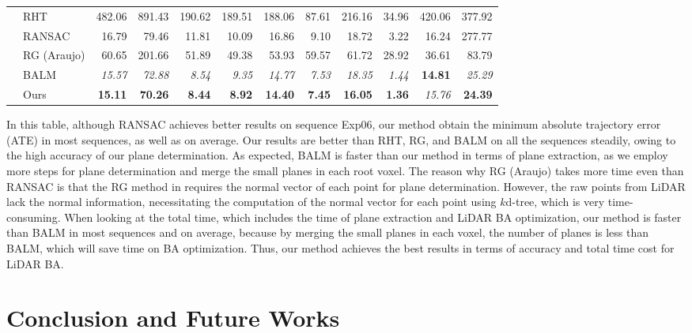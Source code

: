 \documentclass[letterpaper, 10 pt, conference]{ieeeconf}  %
\begin{document}
\begin{table*}
{\begin{tabular}{clrrrrrrrrrr}
			& RHT    & 482.06 & 891.43 & 190.62 & 189.51 & 188.06 & 87.61 & 216.16 & 34.96 & 420.06 & 377.92 \\
			& RANSAC & 16.79 & 79.46 & 11.81 & 10.09 & 16.86 & 9.10 & 18.72 & 3.22 & 16.24 & 277.77 \\
			& RG (Araujo)   & 60.65 & 201.66 & 51.89 & 49.38 & 53.93 & 59.57 & 61.72 & 28.92 & 36.61 & 83.79 \\
			& BALM   & \textit{15.57} & \textit{72.88} & \textit{8.54} & \textit{9.35} & \textit{14.77} & \textit{7.53} & \textit{18.35} & \textit{1.44} & \textbf{14.81} & \textit{25.29} \\
			& Ours   & \textbf{15.11} & \textbf{70.26} & \textbf{8.44} & \textbf{8.92} & \textbf{14.40} & \textbf{7.45} & \textbf{16.05} & \textbf{1.36} & \textit{15.76} & \textbf{24.39} \\
			\bottomrule
		\end{tabular}
	}
\end{table*}

In this table, although RANSAC achieves better results on sequence Exp06, our method obtain the minimum absolute trajectory error (ATE) in most sequences, as well as on average. Our results are better than RHT, RG, and BALM on all the sequences steadily, owing to the high accuracy of our plane determination. As expected, BALM is faster than our method in terms of plane extraction, as we employ more steps for plane determination and merge the small planes in each root voxel. The reason why RG (Araujo) takes more time even than RANSAC is that the RG method in \cite{araujo2020robust} requires the normal vector of each point for plane determination. However, the raw points from LiDAR lack the normal information, necessitating the computation of the normal vector for each point using $k$d-tree, which is very time-consuming. When looking at the total time, which includes the time of plane extraction and LiDAR BA optimization, our method is faster than BALM in most sequences and on average, because by merging the small planes in each voxel, the number of planes is less than BALM, which will save time on BA optimization. Thus, our method achieves the best results in terms of accuracy and total time cost for LiDAR BA.

\section{Conclusion and Future Works} \label{conslusion}
\end{document}
